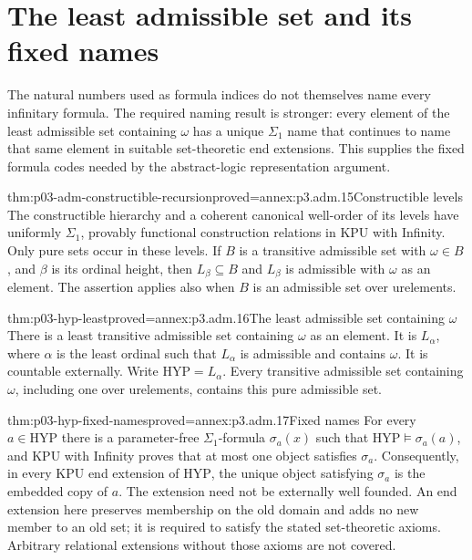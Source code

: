 \section{The least admissible set and its fixed names}
\label{sec:p03-hyp-fixed-names}

The natural numbers used as formula indices do not themselves name every
infinitary formula. The required naming result is stronger: every element
of the least admissible set containing \(\omega\) has a unique
\(\Sigma_1\) name that continues to name that same element in suitable
set-theoretic end extensions. This supplies the fixed formula codes
needed by the abstract-logic representation argument.

\begin{hblemma}{thm:p03-adm-constructible-recursion}{proved=annex:p3.adm.15}{Constructible levels}
The constructible hierarchy and a coherent canonical well-order of its
levels have uniformly \(\Sigma_1\), provably functional construction
relations in KPU with Infinity. Only pure sets occur in these levels.
If \(B\) is a transitive admissible set with \(\omega\in B\), and
\(\beta\) is its ordinal height, then \(L_\beta\subseteq B\) and
\(L_\beta\) is admissible with \(\omega\) as an element.
The assertion applies also when \(B\) is an admissible set over
urelements.
\end{hblemma}

\begin{hbtheorem}{thm:p03-hyp-least}{proved=annex:p3.adm.16}{The least admissible set containing \(\omega\)}
There is a least transitive admissible set containing \(\omega\) as an
element. It is \(L_\alpha\), where \(\alpha\) is the least ordinal
such that \(L_\alpha\) is admissible and contains \(\omega\).
It is countable externally. Write \(\mathrm{HYP}=L_\alpha\).
Every transitive admissible set containing \(\omega\), including one
over urelements, contains this pure admissible set.
\end{hbtheorem}

\begin{hbtheorem}{thm:p03-hyp-fixed-names}{proved=annex:p3.adm.17}{Fixed names}
For every \(a\in\mathrm{HYP}\) there is a parameter-free
\(\Sigma_1\)-formula \(\sigma_a(x)\) such that
\(\mathrm{HYP}\models\sigma_a(a)\), and KPU with Infinity proves
that at most one object satisfies \(\sigma_a\).
Consequently, in every KPU end extension of \(\mathrm{HYP}\), the
unique object satisfying \(\sigma_a\) is the embedded copy of \(a\).
The extension need not be externally well founded.
An end extension here preserves membership on the old domain and adds
no new member to an old set; it is required to satisfy the stated
set-theoretic axioms. Arbitrary relational extensions without those
axioms are not covered.
\end{hbtheorem}

